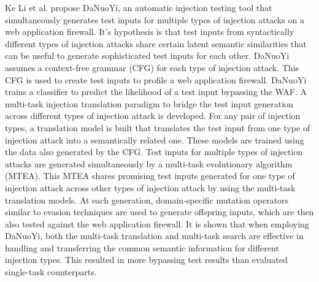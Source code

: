 Ke Li et al. \cite{rw/derLI} propose DaNuoYi, an automatic injection testing tool that simultaneously generates test inputs for multiple types of injection attacks on a web application firewall. It's hypothesis is that test inputs from syntactically different types of injection attacks share certain latent semantic similarities that can be useful to generate sophisticated test inputs for each other. DaNuoYi assumes a context-free grammar (CFG) for each type of injection attack. This CFG is used to create test inputs to profile a web application firewall. DaNuoYi trains a classifier to predict the likelihood of a test input bypassing the WAF. A multi-task injection translation paradigm to bridge the test input generation across different types of injection attack is developed. For any pair of injection types, a translation model is built that translates the test input from one type of injection
attack into a semantically related one. These models are trained using the data also generated by the CFG. Test inputs for multiple types of injection attacks are generated simultaneously by a multi-task evolutionary algorithm (MTEA). This MTEA shares promising test inputs generated for one type of injection attack across other types of injection attack by using the multi-task translation models.
At each generation, domain-specific mutation operators similar to evasion techniques are used to generate offspring inputs, which are then also tested against the web application firewall.
It is shown that when employing DaNuoYi, both the multi-task translation and multi-task search are effective in handling and transferring the common semantic information for different injection types. This resulted in more bypassing test results than evaluated single-task counterparts.
